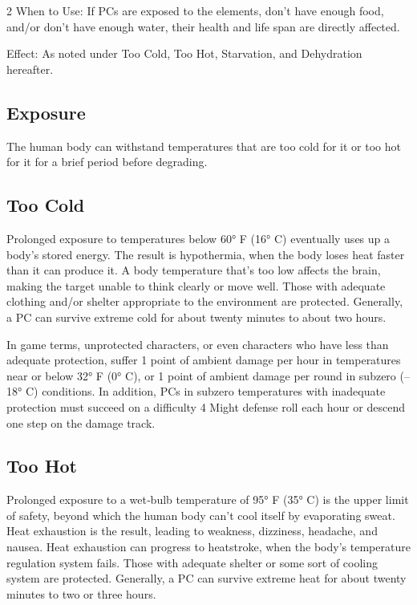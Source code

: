 \begin{multicols}{2}
When to Use: If PCs are exposed to the elements, don’t have enough food, and/or don’t have enough water, their health and life span are directly affected.

Effect: As noted under Too Cold, Too Hot, Starvation, and Dehydration hereafter.

\subsection{Exposure}

The human body can withstand temperatures that are too cold for it or too hot for it for a brief period before degrading. 

\subsection{Too Cold}

Prolonged exposure to temperatures below 60° F (16° C) eventually uses up a body’s stored energy. The result is hypothermia, when the body loses heat faster than it can produce it. A body temperature that’s too low affects the brain, making the target unable to think clearly or move well. Those with adequate clothing and/or shelter appropriate to the environment are protected. Generally, a PC can survive extreme cold for about twenty minutes to about two hours. 

In game terms, unprotected characters, or even characters who have less than adequate protection, suffer 1 point of ambient damage per hour in temperatures near or below 32° F (0° C), or 1 point of ambient damage per round in subzero (–18° C) conditions. In addition, PCs in subzero temperatures with inadequate protection must succeed on a difficulty 4 Might defense roll each hour or descend one step on the damage track.

\subsection{Too Hot}

Prolonged exposure to a wet‑bulb temperature of 95° F (35° C) is the upper limit of safety, beyond which the human body can’t cool itself by evaporating sweat. Heat exhaustion is the result, leading to weakness, dizziness, headache, and nausea. Heat exhaustion can progress to heatstroke, when the body’s temperature regulation system fails. Those with adequate shelter or some sort of cooling system are protected. Generally, a PC can survive extreme heat for about twenty minutes to two or three hours. 


\end{multicols}
